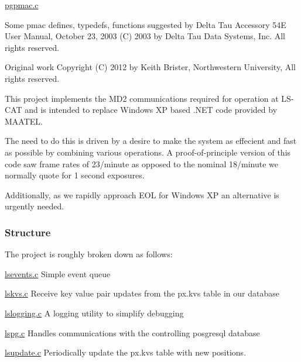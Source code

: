 \hyperlink{pgpmac_8c}{pgpmac.\-c}

Some pmac defines, typedefs, functions suggested by Delta Tau Accessory 54\-E User Manual, October 23, 2003 (C) 2003 by Delta Tau Data Systems, Inc. All rights reserved.

Original work Copyright (C) 2012 by Keith Brister, Northwestern University, All rights reserved.

This project implements the M\-D2 communications required for operation at L\-S-\/\-C\-A\-T and is intended to replace Windows X\-P based .N\-E\-T code provided by M\-A\-A\-T\-E\-L.

The need to do this is driven by a desire to make the system as effecient and fast as possible by combining various operations. A proof-\/of-\/principle version of this code saw frame rates of 23/minute as opposed to the nominal 18/minute we normally quote for 1 second exposures.

Additionally, as we rapidly approach E\-O\-L for Windows X\-P an alternative is urgently needed.

\subsubsection*{Structure}

The project is roughly broken down as follows\-: 
\begin{DoxyPre}
    \hyperlink{lsevents_8c}{lsevents.c}          Simple event queue\end{DoxyPre}



\begin{DoxyPre}    \hyperlink{lskvs_8c}{lskvs.c}             Receive key value pair updates from the px.kvs table in our database\end{DoxyPre}



\begin{DoxyPre}    \hyperlink{lslogging_8c}{lslogging.c}         A logging utility to simplify debugging\end{DoxyPre}



\begin{DoxyPre}    \hyperlink{lspg_8c}{lspg.c}              Handles communications with the controlling posgresql database\end{DoxyPre}



\begin{DoxyPre}    \hyperlink{lsupdate_8c}{lsupdate.c}          Periodically update the px.kvs table with new positions.\end{DoxyPre}



